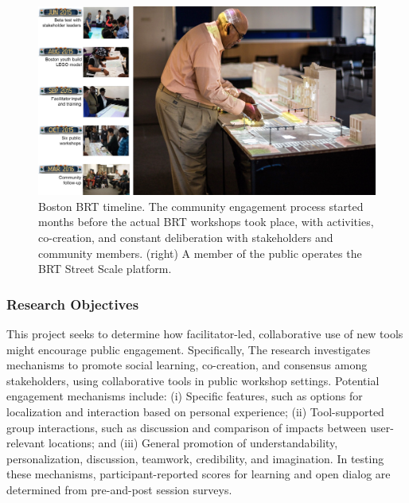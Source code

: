 {{        \begin{figure}[!htb]
            \begin{center}
                \includegraphics[width=1\textwidth]{chapters/consensus/BRT/figures/brt2.jpeg}
            \end{center}
            \caption{Boston BRT timeline. The community engagement process started months before the actual BRT workshops took place, with activities, co-creation, and constant deliberation with stakeholders and community members. (right) A member of the public operates the BRT Street Scale platform.}
            \label{fig:brt_exit_timeline}
        \end{figure}


        \subsubsection{Research Objectives}
        {
            This project seeks to determine how facilitator-led, collaborative use of new tools might encourage public engagement. Specifically, The research investigates mechanisms to promote social learning, co-creation, and consensus among stakeholders, using collaborative tools in public workshop settings. Potential engagement mechanisms include: (i) Specific features, such as options for localization and interaction based on personal experience; (ii) Tool-supported group interactions, such as discussion and comparison of impacts between user-relevant locations; and (iii) General promotion of understandability, personalization, discussion, teamwork, credibility, and imagination. In testing these mechanisms, participant-reported scores for learning and open dialog are determined from pre-and-post session surveys.
        }


}}
